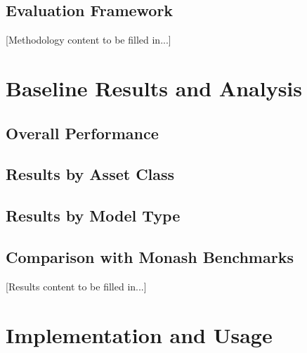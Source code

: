 \documentclass{article}
\begin{document}
\subsection{Evaluation Framework}

[Methodology content to be filled in...]

\section{Baseline Results and Analysis}
\label{sec:results}


\subsection{Overall Performance}

\subsection{Results by Asset Class}

\subsection{Results by Model Type}

\subsection{Comparison with Monash Benchmarks}

[Results content to be filled in...]

\section{Implementation and Usage}
\label{sec:implementation}

\end{document}
